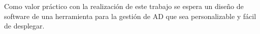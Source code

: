 Como valor práctico con la realización de este trabajo se espera un diseño de software de una herramienta para la gestión de AD que sea personalizable y fácil de desplegar.
